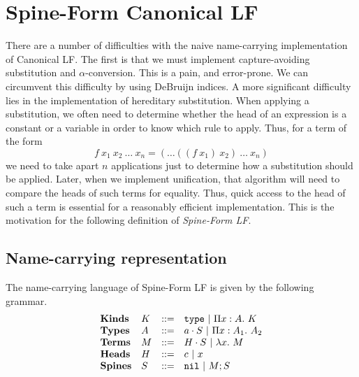 \documentclass[11pt,twoside]{article}
\begin{document}

\section{Spine-Form Canonical LF}

There are a number of difficulties with the naive name-carrying
implementation of Canonical LF.  The first is that we must
implement capture-avoiding substitution and $\alpha$-conversion.
This is a pain, and error-prone.  We can circumvent this difficulty
by using DeBruijn indices\cite{DeBruijn80}.  A more significant 
difficulty lies in the implementation of hereditary substitution. 
When applying a substitution, we often need to determine whether
the head of an expression is a constant or a variable in order
to know which rule to apply.  Thus, for a term of the form
$$f\ x_1\ x_2\ \ldots\ x_n = (\ldots((f\ x_1)\ x_2)\ \ldots\ x_n) $$
we need to take apart $n$ applications just to determine how
a substitution should be applied.  Later, when we implement
unification, that algorithm will need to compare the heads
of such terms for equality.  Thus, quick access to the head
of such a term is essential for a reasonably efficient implementation.
This is the motivation for the following definition of 
\emph{Spine-Form LF}.

\subsection{Name-carrying representation}

The name-carrying language of Spine-Form LF is given by the following
grammar.
$$
\begin{array}{llll}
\mathbf{Kinds} & K & ::= & \mathtt{type} \ |\  \Pi x : A.\ K \\
\mathbf{Types} & A & ::= & a\cdot S \ |\  \Pi x : A_1.\ A_2 \\
\mathbf{Terms} & M & ::= & H\cdot S \ |\  \lambda x.\ M \\
\mathbf{Heads} & H & ::= & c \ |\  x\\
\mathbf{Spines} & S & ::= & \mathtt{nil} \ |\  M;S\\
\end{array} 
$$

\end{document}
